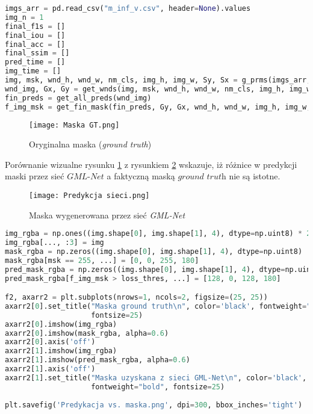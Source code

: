 \cell
\begin{lstlisting}[name=Rozdzial3.1, language=Python]
imgs_arr = pd.read_csv("m_inf_v.csv", header=None).values
img_n = 1
final_f1s = []
final_iou = []
final_acc = []
final_ssim = []
pred_time = []
img_time = []
img, msk, wnd_h, wnd_w, nm_cls, img_h, img_w, Sy, Sx = g_prms(imgs_arr, img_n)
wnd_img, Gx, Gy = get_wnds(img, msk, wnd_h, wnd_w, nm_cls, img_h, img_w, Sy, Sx)
fin_preds = get_all_preds(wnd_img)
f_img_msk = get_fin_mask(fin_preds, Gy, Gx, wnd_h, wnd_w, img_h, img_w, Sy, Sx)
\end{lstlisting}

\begin{figure}[!h]
    \centering \texttt{[image: Maska GT.png]}
    \captionsetup{format=hang}
    \caption{Oryginalna maska (\textit{ground truth})}
    \label{fig:predGT1}
\end{figure}

\cell
Porównanie wizualne rysunku \ref{fig:predGT1} z rysunkiem \ref{fig:predGT2} wskazuje, iż różnice w predykcji maski przez sieć $\textit{GML-Net}$ a faktyczną maską $\textit{ground truth}$ nie są istotne.

\begin{figure}[!h]
    \centering \texttt{[image: Predykcja sieci.png]}
    \captionsetup{format=hang}
    \caption{Maska wygenerowana przez sieć \textit{GML-Net}}
    \label{fig:predGT2}
\end{figure}

\cell
\begin{lstlisting}[name=Rozdzial3.1, language=Python]
img_rgba = np.ones((img.shape[0], img.shape[1], 4), dtype=np.uint8) * 255
img_rgba[..., :3] = img
mask_rgba = np.zeros((img.shape[0], img.shape[1], 4), dtype=np.uint8)
mask_rgba[msk == 255, ...] = [0, 0, 255, 180]
pred_mask_rgba = np.zeros((img.shape[0], img.shape[1], 4), dtype=np.uint8)
pred_mask_rgba[f_img_msk > loss_thres, ...] = [128, 0, 128, 180]

f2, axarr2 = plt.subplots(nrows=1, ncols=2, figsize=(25, 25))
axarr2[0].set_title("Maska ground truth\n", color='black', fontweight="bold",
                    fontsize=25)
axarr2[0].imshow(img_rgba)
axarr2[0].imshow(mask_rgba, alpha=0.6)
axarr2[0].axis('off')
axarr2[1].imshow(img_rgba)
axarr2[1].imshow(pred_mask_rgba, alpha=0.6)
axarr2[1].axis('off')
axarr2[1].set_title("Maska uzyskana z sieci GML-Net\n", color='black', 
                    fontweight="bold", fontsize=25)
                    
plt.savefig('Predykacja vs. maska.png', dpi=300, bbox_inches='tight')
\end{lstlisting}


